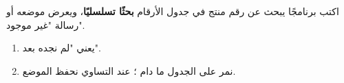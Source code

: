 \begin{statement}
اكتب برنامجًا يبحث عن رقم منتج في جدول الأرقام \textbf{بحثًا تسلسليًا}، ويعرض موضعه أو رسالة "غير موجود".
\end{statement}
\begin{stepsbox}\begin{enumerate}
\item {} يعني "لم نجده بعد".
\item نمر على الجدول ما دام ؛ عند التساوي نحفظ الموضع.
\end{enumerate}\end{stepsbox}
